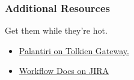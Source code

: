\documentclass{beamer}
\begin{document}
\begin{frame}[fragile]
  \frametitle{Additional Resources}

  Get them while they're hot.

  \begin{itemize}
  \item{\href{http://tolkiengateway.net/wiki/Palant\%C3\%ADri}{Palantiri on Tolkien Gateway.}}
  \item{\href{https://confluence.atlassian.com/display/JIRA/Configuring+Workflow}{Workflow Docs on JIRA}}
  \end{itemize}

\end{frame}
\end{document}

